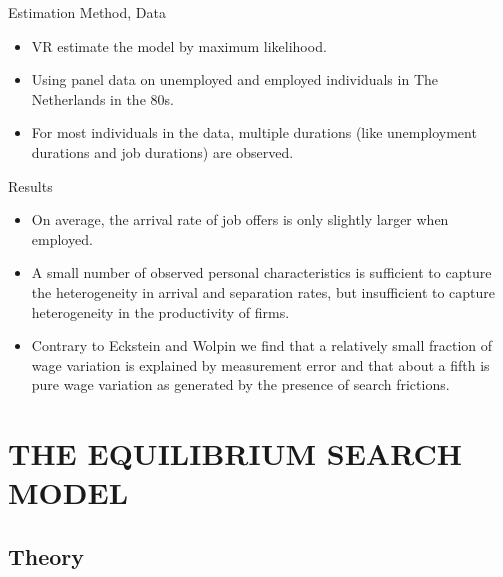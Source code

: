 \documentclass{beamer}
\begin{document}
\begin{frame}{Estimation Method, Data}
    \begin{itemize}
        \item VR estimate the model by maximum likelihood.
        \item Using panel data on unemployed and employed individuals in The Netherlands in the 80s.
        \item For most individuals in the data, multiple durations (like unemployment durations and job durations) are observed.
    \end{itemize}
\end{frame}


\begin{frame}{Results}
    \begin{itemize}
        \item On average, the arrival rate of job offers is only slightly larger when employed.
        \item A small number of observed personal characteristics is suﬃcient to capture the heterogeneity in arrival and separation rates, but insuﬃcient to capture heterogeneity in the productivity of ﬁrms.
        \item Contrary to Eckstein and Wolpin we find that a relatively small fraction of wage variation is explained by measurement error and that about a fifth is pure wage variation as generated by the presence of search frictions.
    \end{itemize}
\end{frame}



\section{THE EQUILIBRIUM SEARCH MODEL}
\subsection{Theory}
\end{document}
